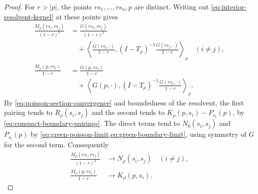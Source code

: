\begin{proof}
For $r>|p|$, the points $rs_1,\ldots,rs_n,p$ are distinct.
Writing out \eqref{eq:interior-resolvent-kernel} at these points gives
\begin{equation}\label{eq:scaled-resolvent-evaluations}
 \begin{aligned}
 \frac{M_\rho(rs_i,rs_j)}{(1-r)^2}
 &=\frac{G(rs_i,rs_j)}{(1-r)^2}\\
 &\quad+\left\langle\frac{G(rs_i,\cdot)}{1-r},
 (I-T_\rho)^{-1}\frac{G(rs_j,\cdot)}{1-r}\right\rangle_\rho
 \quad(i\ne j),\\
 \frac{M_\rho(p,rs_i)}{1-r}
 &=\frac{G(p,rs_i)}{1-r}\\
 &\quad+\left\langle G(p,\cdot),
 (I-T_\rho)^{-1}\frac{G(rs_i,\cdot)}{1-r}\right\rangle_\rho.
 \end{aligned}
\end{equation}
By \eqref{eq:poisson-section-convergence} and boundedness of the
resolvent, the first pairing tends to $R_\rho(s_i,s_j)$ and the
second tends to $K_\rho(p,s_i)-P_{s_i}(p)$, by
\eqref{eq:compact-boundary-pairings}. The direct terms tend to
$N_0(s_i,s_j)$ and $P_{s_i}(p)$ by
\cref{eq:green-poisson-limit,eq:green-boundary-limit}, using symmetry
of $G$ for the second term. Consequently
\begin{equation}\label{eq:boundary-resolvent-limits}
 \begin{aligned}
 \frac{M_\rho(rs_i,rs_j)}{(1-r)^2}&\longrightarrow N_\rho(s_i,s_j)
 \quad(i\ne j),\\
 \frac{M_\rho(p,rs_i)}{1-r}&\longrightarrow K_\rho(p,s_i).
 \end{aligned}
\end{equation}


\end{proof}
